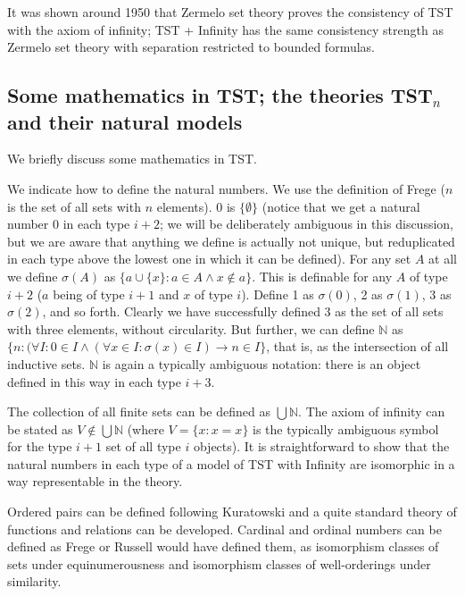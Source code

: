 \documentclass[12pt]{article}
\begin{document}
It was shown around 1950 that Zermelo set theory proves the consistency of TST with the axiom of infinity;  TST + Infinity has the same consistency strength as
Zermelo set theory with separation restricted to bounded formulas.


\newpage

\subsection{Some mathematics in TST;  the theories TST$_n$ and their natural models}

We briefly discuss some mathematics in TST.

We indicate how to define the natural numbers.  We use the definition of Frege ($n$ is the set of all sets with $n$ elements).  0 is $\{\emptyset\}$ (notice that we get a natural number 0 in each type $i+2$;  we will be deliberately ambiguous in this discussion, but we are aware that anything we define is actually not unique, but reduplicated in each type above the lowest one in which it can be defined).  For any set $A$ at all we define $\sigma(A)$ as $\{a \cup \{x\}:a \in A \wedge x \not\in a\}$.  This is definable for any $A$ of type $i+2$ ($a$ being of type $i+1$ and $x$ of type $i$).  Define 1 as $\sigma(0)$, 2 as $\sigma(1)$,  3 as $\sigma(2)$, and so forth.  Clearly we have successfully defined 3 as the set of all sets with three elements, without circularity.
But further, we can define $\mathbb N$ as $\{n:(\forall I:0 \in I \wedge (\forall x \in I:\sigma(x) \in I) \rightarrow n \in I\}$, that is, as the intersection of all inductive sets.
$\mathbb N$ is again a typically ambiguous notation:  there is an object defined in this way in each type $i+3$.

The collection of all finite sets can be defined as $\bigcup \mathbb N$.  The axiom of infinity can be stated as $V \not\in \bigcup \mathbb N$ (where $V= \{x:x=x\}$ is the typically ambiguous symbol for the type $i+1$ set of all type $i$ objects).  It is straightforward to show that the natural numbers in each type of a model of TST with Infinity are isomorphic in a way representable in the theory.

Ordered pairs can be defined following Kuratowski and a quite standard theory of functions and relations can be developed.  Cardinal and ordinal numbers can be defined as Frege or Russell would have defined them, as isomorphism classes of sets under equinumerousness and isomorphism classes of well-orderings under similarity.  
\end{document}
